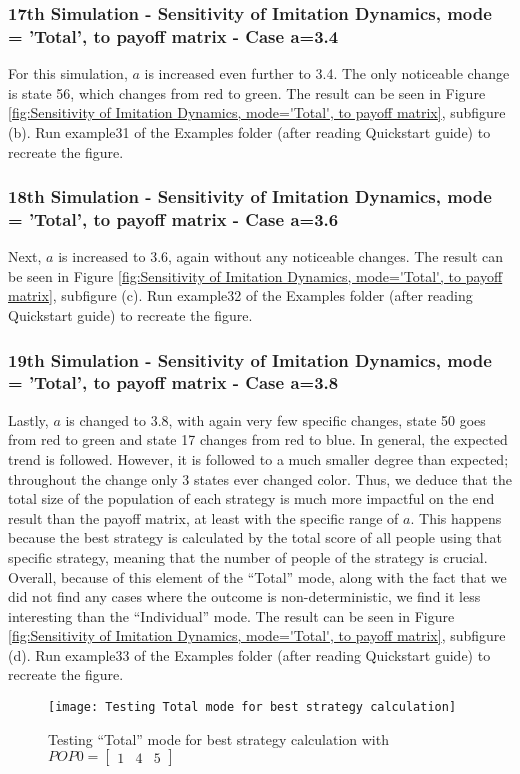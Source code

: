 \subsubsection{17th Simulation - Sensitivity of Imitation Dynamics, mode = 'Total', to payoff matrix - Case a=3.4}
For this simulation, $a$ is increased even further to 3.4. The only noticeable change is state 56, which changes from red to green. The result can be seen in Figure \ref{fig:Sensitivity of Imitation Dynamics, mode='Total', to payoff matrix}, subfigure (b). Run example31 of the Examples folder (after reading Quickstart guide) to recreate the figure.

\subsubsection{18th Simulation - Sensitivity of Imitation Dynamics, mode = 'Total', to payoff matrix - Case a=3.6}
Next, $a$ is increased to 3.6, again without any noticeable changes. The result can be seen in Figure \ref{fig:Sensitivity of Imitation Dynamics, mode='Total', to payoff matrix}, subfigure (c). Run example32 of the Examples folder (after reading Quickstart guide) to recreate the figure.

\subsubsection{19th Simulation - Sensitivity of Imitation Dynamics, mode = 'Total', to payoff matrix - Case a=3.8}
Lastly, $a$ is changed to 3.8, with again very few specific changes, state 50 goes from red to green and state 17 changes from red to blue. In general, the expected trend is followed. However, it is followed to a much smaller degree than expected; throughout the change only 3 states ever changed color. Thus, we deduce that the total size of the population of each strategy is much more impactful on the end result than the payoff matrix, at least with the specific range of $a$. This happens because the best strategy is calculated by the total score of all people using that specific strategy, meaning that the number of people of the strategy is crucial. Overall, because of this element of the ``Total'' mode, along with the fact that we did not find any cases where the outcome is non-deterministic, we find it less interesting than the ``Individual'' mode. The result can be seen in Figure \ref{fig:Sensitivity of Imitation Dynamics, mode='Total', to payoff matrix}, subfigure (d). Run example33 of the Examples folder (after reading Quickstart guide) to recreate the figure.
	\begin{figure}[h]
	      \centering
	      \texttt{[image: Testing Total mode for best strategy calculation]}
	      \caption{Testing ``Total'' mode for best strategy calculation with $POP0=\begin{bmatrix}1&4&5\end{bmatrix}$}
	      \label{fig:TourTheImiTotal}
	\end{figure}
	
